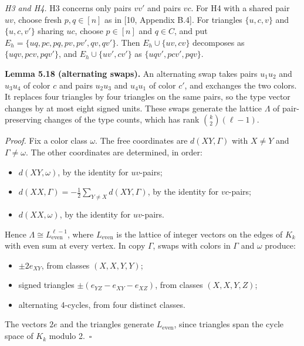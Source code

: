 \documentclass[english,11pt,a4paper]{article}
\providecommand{\tightlist}{\setlength{\itemsep}{0pt}\setlength{\parskip}{0pt}}
\begin{document}
\emph{H3 and H4.} H3 concerns only pairs \(vv'\) and pairs \(vc\). For H4 with a shared pair \(uv\), choose fresh \(p,q\in[n]\) as in {[}10, Appendix B.4{]}. For triangles \(\{u,c,v\}\) and \(\{u,c,v'\}\) sharing \(uc\), choose \(p\in[n]\) and \(q\in C\), and put \(E_h=\{uq,pc,pq,pv,pv',qv,qv'\}\). Then \(E_h\cup\{uv,cv\}\) decomposes as \(\{uqv,pcv,pqv'\}\), and \(E_h\cup\{uv',cv'\}\) as \(\{uqv',pcv',pqv\}\).

\textbf{Lemma 5.18 (alternating swaps).} An alternating swap takes pairs \(u_1u_2\) and \(u_3u_4\) of color \(c\) and pairs \(u_2u_3\) and \(u_4u_1\) of color \(c'\), and exchanges the two colors. It replaces four triangles by four triangles on the same pairs, so the type vector changes by at most eight signed units. These swaps generate the lattice \(\Lambda\) of pair-preserving changes of the type counts, which has rank \(\binom{k}{2}(\ell-1)\).

\emph{Proof.} Fix a color class \(\omega\). The free coordinates are \(d(XY,\Gamma)\) with \(X\ne Y\) and \(\Gamma\ne\omega\). The other coordinates are determined, in order:

\begin{itemize}
\tightlist
\item
  \(d(XY,\omega)\), by the identity for \(uv\)-pairs;
\item
  \(d(XX,\Gamma)=-\frac12\sum_{Y\ne X}d(XY,\Gamma)\), by the identity for \(vc\)-pairs;
\item
  \(d(XX,\omega)\), by the identity for \(uv\)-pairs.
\end{itemize}

Hence \(\Lambda\cong L_{\mathrm{even}}^{\ell-1}\), where \(L_{\mathrm{even}}\) is the lattice of integer vectors on the edges of \(K_k\) with even sum at every vertex. In copy \(\Gamma\), swaps with colors in \(\Gamma\) and \(\omega\) produce:

\begin{itemize}
\tightlist
\item
  \(\pm2e_{XY}\), from classes \((X,X,Y,Y)\);
\item
  signed triangles \(\pm(e_{YZ}-e_{XY}-e_{XZ})\), from classes \((X,X,Y,Z)\);
\item
  alternating 4-cycles, from four distinct classes.
\end{itemize}

The vectors \(2e\) and the triangles generate \(L_{\mathrm{even}}\), since triangles span the cycle space of \(K_k\) modulo 2.~\(\square\)
\end{document}

